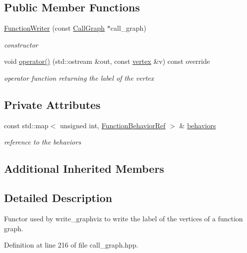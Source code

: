 \subsection*{Public Member Functions}
\begin{DoxyCompactItemize}
\item 
\hyperlink{classFunctionWriter_a8b47649d2d52f4c5e7bad61b123e65a9}{Function\+Writer} (const \hyperlink{classCallGraph}{Call\+Graph} $\ast$call\+\_\+graph)
\begin{DoxyCompactList}\small\item\em constructor \end{DoxyCompactList}\item 
void \hyperlink{classFunctionWriter_af935396f9e2d8a4ac426655ab37bcb39}{operator()} (std\+::ostream \&out, const \hyperlink{graph_8hpp_abefdcf0544e601805af44eca032cca14}{vertex} \&v) const override
\begin{DoxyCompactList}\small\item\em operator function returning the label of the vertex \end{DoxyCompactList}\end{DoxyCompactItemize}
\subsection*{Private Attributes}
\begin{DoxyCompactItemize}
\item 
const std\+::map$<$ unsigned int, \hyperlink{function__behavior_8hpp_affbc6a46ab86ddfabe31c10986d333dc}{Function\+Behavior\+Ref} $>$ \& \hyperlink{classFunctionWriter_aa3a722adfbe6e316629886c0c20fb317}{behaviors}
\begin{DoxyCompactList}\small\item\em reference to the behaviors \end{DoxyCompactList}\end{DoxyCompactItemize}
\subsection*{Additional Inherited Members}


\subsection{Detailed Description}
Functor used by write\+\_\+graphviz to write the label of the vertices of a function graph. 

Definition at line 216 of file call\+\_\+graph.\+hpp.



